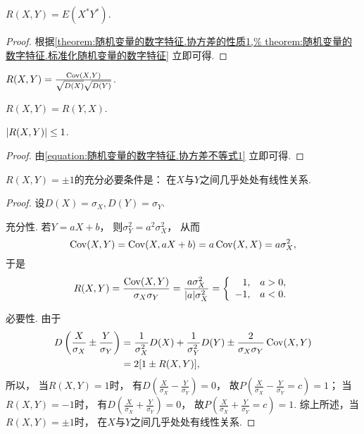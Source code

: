 \begin{theorem}\label{theorem:随机变量的数字特征.相关系数的性质1}
\(R(X,Y) = E(X^* Y^*)\).
\begin{proof}
根据\cref{theorem:随机变量的数字特征.协方差的性质1,%
theorem:随机变量的数字特征.标准化随机变量的数字特征} 立即可得.
\end{proof}
\end{theorem}

\begin{theorem}\label{theorem:随机变量的数字特征.相关系数的性质2}
\(R(X,Y) = \frac{\operatorname{Cov}(X,Y)}{\sqrt{D(X)} \sqrt{D(Y)}}\).
\end{theorem}

\begin{property}
\(R(X,Y)=R(Y,X)\).
\end{property}

\begin{property}
\(\abs{R(X,Y)} \leq 1\).
\begin{proof}
由\cref{equation:随机变量的数字特征.协方差不等式1} 立即可得.
\end{proof}
\end{property}

\begin{theorem}
\(R(X,Y) = \pm1\)的充分必要条件是：
在\(X\)与\(Y\)之间几乎处处有线性关系.
\begin{proof}
设\(D(X) = \sigma_X,
D(Y) = \sigma_Y\).

充分性.
若\(Y=aX+b\)，
则\(\sigma_Y^2=a^2\sigma_X^2\)，
从而\[
	\operatorname{Cov}(X,Y)
	= \operatorname{Cov}(X,aX+b)
	= a\operatorname{Cov}(X,X)
	= a\sigma_X^2,
\]
于是\[
	R(X,Y)
	= \frac{\operatorname{Cov}(X,Y)}{\sigma_X \sigma_Y}
	= \frac{a \sigma_X^2}{\abs{a} \sigma_X^2}
	= \left\{ \begin{array}{rl}
		1, & a>0, \\
		-1, & a<0.
	\end{array} \right.
\]

必要性.
由于\begin{align*}
	D\left(\frac{X}{\sigma_X} \pm \frac{Y}{\sigma_Y}\right)
	&= \frac1{\sigma_X^2} D(X) + \frac1{\sigma_Y^2} D(Y)
		\pm \frac2{\sigma_X \sigma_Y} \operatorname{Cov}(X,Y) \\
	&= 2[1 \pm R(X,Y)],
\end{align*}
所以，
当\(R(X,Y)=1\)时，
有\(D\left(\frac{X}{\sigma_X} - \frac{Y}{\sigma_Y}\right) = 0\)，
故\(P\left(\frac{X}{\sigma_X} - \frac{Y}{\sigma_Y} = c\right) = 1\)；
当\(R(X,Y)=-1\)时，
有\(D\left(\frac{X}{\sigma_X} + \frac{Y}{\sigma_Y}\right) = 0\)，
故\(P\left(\frac{X}{\sigma_X} + \frac{Y}{\sigma_Y} = c\right) = 1\).
综上所述，当\(R(X,Y)=\pm1\)时，
在\(X\)与\(Y\)之间几乎处处有线性关系.
\end{proof}
\end{theorem}


